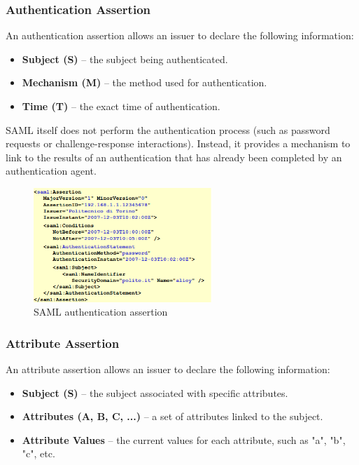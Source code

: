 \subsubsection{Authentication Assertion}

An authentication assertion allows an issuer to declare the following
information:

\begin{itemize}
    \item \textbf{Subject (S)} – the subject being authenticated.
    \item \textbf{Mechanism (M)} – the method used for authentication.
    \item \textbf{Time (T)} – the exact time of authentication.
\end{itemize}

\begin{boxH}
  SAML itself does not perform the authentication process (such as
  password requests or challenge-response interactions). Instead, it
  provides a mechanism to link to the results of an authentication
  that has already been completed by an authentication agent.
\end{boxH}


\begin{figure}[H]
  \centering
  \includegraphics[width=0.6\textwidth]{img/saml auth assertion.png}
  \caption{SAML authentication assertion}
\end{figure}

\subsubsection{Attribute Assertion}

An attribute assertion allows an issuer to declare the following
information:

\begin{itemize}
    \item \textbf{Subject (S)} – the subject associated with specific
      attributes.
    \item \textbf{Attributes (A, B, C, ...)} – a set of attributes
      linked to the subject.
    \item \textbf{Attribute Values} – the current values for each
      attribute, such as "a", "b", "c", etc.
\end{itemize}

